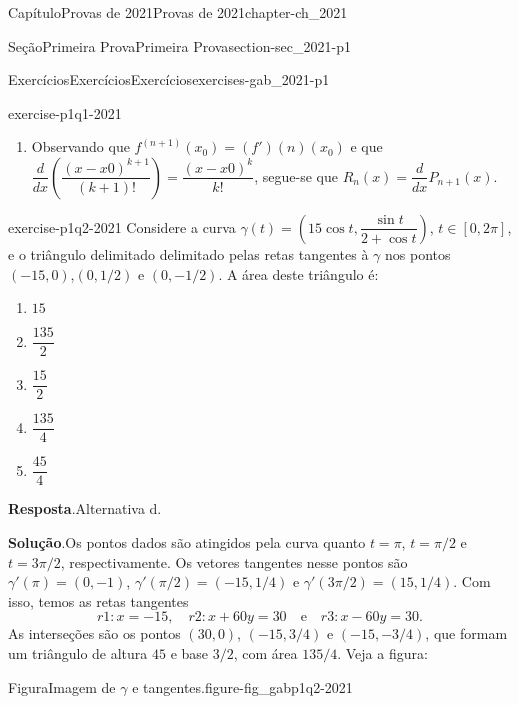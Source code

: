 \documentclass[oneside,10pt,]{book}
\newcommand{\blocktitlefont}{\relax}
\numberwithin{equation}{section}
\begin{document}
\begin{chapterptx}{Capítulo}{Provas de 2021}{}{Provas de 2021}{}{}{chapter-ch_2021}
\begin{sectionptx}{Seção}{Primeira Prova}{}{Primeira Prova}{}{}{section-sec_2021-p1}
\begin{exercises-subsection-numberless}{Exercícios}{Exercícios}{}{Exercícios}{}{}{exercises-gab_2021-p1}
\begin{divisionexercise}{1}{}{}{exercise-p1q1-2021}
\begin{enumerate}[label=\alph*]
\item{}Observando que \(f^{(n+1)}(x_0)=(f')(n)(x_0)\) e que \(\dfrac{d}{dx}\left(\dfrac{(x-x0)^{k+1}}{(k+1)!}\right)=\dfrac{(x-x0)^k}{k!}\), segue-se que \(R_n(x)=\dfrac{d}{dx}P_{n+1}(x)\).%
\end{enumerate}
%
\end{divisionexercise}%
\begin{divisionexercise}{2}{}{}{exercise-p1q2-2021}%
Considere a curva \(\gamma(t)=\left(15\cos t,\dfrac{\sin
t}{2+\cos t}\right)\), \(t\in[0,2\pi]\), e o triângulo delimitado delimitado pelas retas tangentes à \(\gamma\) nos pontos \((-15,0)\),\((0,1/2)\) e \((0,-1/2)\). A área deste triângulo é:%
\begin{multicols}{5}
\begin{enumerate}[label=\alph*]
\item{}\(\displaystyle 15\)%
\item{}\(\displaystyle \dfrac{135}{2}\)%
\item{}\(\displaystyle \dfrac{15}{2}\)%
\item{}\(\displaystyle \dfrac{135}{4}\)%
\item{}\(\displaystyle \dfrac{45}{4}\)%
\end{enumerate}
\end{multicols}
%
\par\smallskip%
\noindent\textbf{\blocktitlefont Resposta}.\hypertarget{answer-p1q2-2021-b}{}\quad{}Alternativa d.%
\par\smallskip%
\noindent\textbf{\blocktitlefont Solução}.\hypertarget{solution-p1q2-2021-c}{}\quad{}Os pontos dados são atingidos pela curva quanto \(t=\pi\), \(t=\pi/2\) e \(t=3\pi/2\), respectivamente. Os vetores tangentes nesse pontos são \(\gamma'(\pi)=(0,-1)\), \(\gamma'(\pi/2)=(-15,1/4)\) e \(\gamma'(3\pi/2)=(15,1/4)\). Com isso, temos as retas tangentes%
\begin{equation*}
r1\colon x=-15,\quad r2\colon
x+60y=30\quad\text{e}\quad r3\colon x-60y=30\text{.}
\end{equation*}
As interseções são os pontos \((30,0)\), \((-15,3/4)\) e \((-15,-3/4)\), que formam um triângulo de altura \(45\) e base \(3/2\), com área \(135/4\). Veja a figura: \begin{figureptx}{Figura}{Imagem de \(\gamma\) e tangentes.}{figure-fig_gabp1q2-2021}{}%
\begin{image}{0.25}{0.5}{0.25}{}%
\end{image}
\end{figureptx}
\end{divisionexercise}
\end{exercises-subsection-numberless}
\end{sectionptx}
\end{chapterptx}
\end{document}
